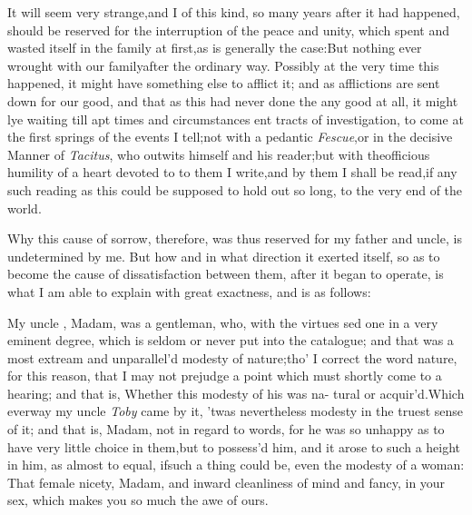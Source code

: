 \documentclass{article}
\begin{document}
It will seem very strange,\tsh  and I\break 
{}
of this kind, so many years after it had happened,
should be reserved for the interruption of the peace and unity,
which 
spent and wasted itself in the family at
first,\tsk  as is generally the case:\tsk  But nothing ever
wrought with our family\break after the ordinary way. Possibly at the
very time this happened, it might have 
something else to afflict it; and as afflictions
are sent down for our good, and that as this
had never done the 
any good at all, it might lye\break
waiting till apt times and circumstances 
ent tracts of investigation, to come at
the first springs of the events I tell;\tsk\break  not with a pedantic
\textit{Fescue},\tsk  or in the decisive Manner of \textit{Tacitus},
who outwits himself and his reader;\tsk  but with the\break officious
humility of a heart devoted to 
to them I write,\tsh  and by them I
shall be read,\tsh  if any such reading as this could be
supposed to hold out so long,\break
to the very end of the
world.\\\eject

Why this cause of sorrow, therefore, was thus reserved for my
father and uncle, is undetermined by me. But how and in what
direction it exerted itself, so as to become the cause of
dissatisfaction between them, after it began to operate, is what I
am able to explain with great exactness, and is as follows:

My uncle , Madam, was a
gentleman, who, with the virtues 
sed one in a very eminent degree,
which is seldom or never put into the catalogue; and that was a
most extream and unparallel’d modesty of
nature;\tsh  tho’ I correct the word nature, for this
reason, that I may not prejudge a point which must shortly come to
a hearing; and that is, Whether this modesty of his was na- tural or
acquir’d.\tsh  Which ever\break way my uncle \textit{Toby}
came by it, ’twas nevertheless modesty in the truest sense of
it; and that is, Madam, not in regard to words, for he was so
unhappy as to have very little choice in them,\tsk  but to
possess’d him, and
it arose to such a height in him, as almost to equal, if\break such a
thing could be, even the modesty of a woman: That female nicety,
Madam, and inward cleanliness of mind and fancy, in your sex, which
makes you so much the awe of ours.
\end{document}
